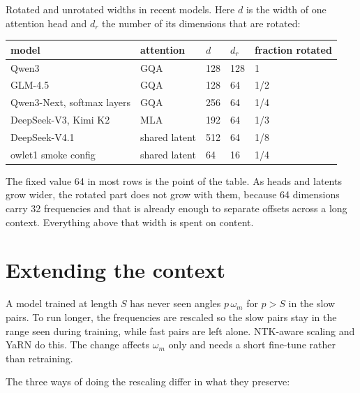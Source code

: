 Rotated and unrotated widths in recent models. Here \(d\) is the width
of one attention head and \(d_r\) the number of its dimensions that are
rotated:

\begin{table}[t]
\centering\small
\begin{tabular}{lllll}
\toprule\noalign{}
model & attention & \(d\) & \(d_r\) & fraction rotated \\
\midrule\noalign{}
\endhead
Qwen3 & GQA & 128 & 128 & 1 \\
GLM-4.5 & GQA & 128 & 64 & 1/2 \\
Qwen3-Next, softmax layers & GQA & 256 & 64 & 1/4 \\
DeepSeek-V3, Kimi K2 & MLA & 192 & 64 & 1/3 \\
DeepSeek-V4.1 & shared latent & 512 & 64 & 1/8 \\
owlet1 smoke config & shared latent & 64 & 16 & 1/4 \\
\bottomrule
\end{tabular}\end{table}

The fixed value 64 in most rows is the point of the table. As heads and
latents grow wider, the rotated part does not grow with them, because 64
dimensions carry 32 frequencies and that is already enough to separate
offsets across a long context. Everything above that width is spent on
content.

\hypertarget{extending-the-context}{%
\section{Extending the context}\label{extending-the-context}}

A model trained at length \(S\) has never seen angles \(p\,\omega_m\)
for \(p > S\) in the slow pairs. To run longer, the frequencies are
rescaled so the slow pairs stay in the range seen during training, while
fast pairs are left alone. NTK-aware scaling and YaRN do this. The
change affects \(\omega_m\) only and needs a short fine-tune rather than
retraining.

The three ways of doing the rescaling differ in what they preserve:

